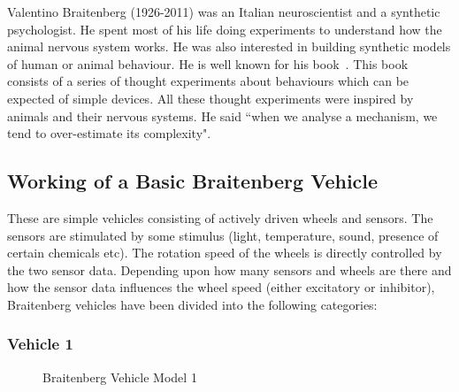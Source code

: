 \documentclass[main.tex]{subfiles}
\begin{document}
    Valentino Braitenberg (1926-2011) was an Italian neuroscientist and a synthetic psychologist. He spent most of his life doing experiments to understand how the animal nervous system works. He was also interested in building synthetic models of human or animal behaviour. He is well known for his book~\cite{braitenberg1986vehicles}. This book consists of a series of thought experiments about behaviours which can be expected of simple devices. All these thought experiments were inspired by animals and their nervous systems. He said ``when we analyse a mechanism, we tend to over-estimate its complexity".

    \subsection{Working of a Basic Braitenberg Vehicle}
    These are simple vehicles consisting of actively driven wheels and sensors. The sensors are stimulated by some stimulus (light, temperature, sound, presence of certain chemicals etc). The rotation speed of the wheels is directly controlled by the two sensor data. Depending upon how many sensors and wheels are there and how the sensor data influences the wheel speed (either excitatory or inhibitor), Braitenberg vehicles have been divided into the following categories:



    \subsubsection{Vehicle 1}
    \label{sec:Vehicle_1}

        \begin{figure}[t]%
            \centering
            \qquad
            \caption{Braitenberg Vehicle Model 1}%
            \label{fig:vehicle1}%
        \end{figure}
\end{document}
